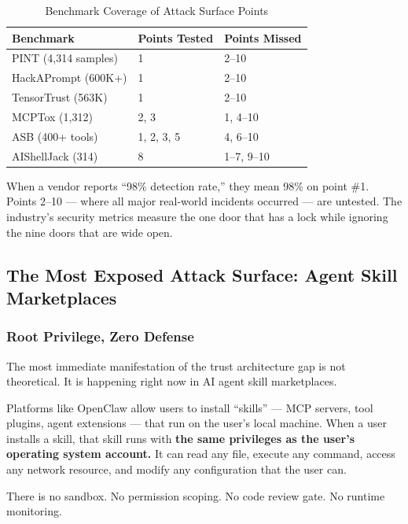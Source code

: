 \documentclass[11pt,letterpaper]{article}
\begin{document}
\begin{table}[htbp]
\centering
\caption{Benchmark Coverage of Attack Surface Points}
\label{tab:benchmarks}
\begin{tabular}{lll}
\toprule
\textbf{Benchmark} & \textbf{Points Tested} & \textbf{Points Missed} \\
\midrule
PINT (4,314 samples) \cite{pint} & 1 & 2--10 \\
HackAPrompt (600K+) \cite{hacka} & 1 & 2--10 \\
TensorTrust (563K) \cite{tensortrust} & 1 & 2--10 \\
MCPTox (1,312) \cite{mcptox} & 2, 3 & 1, 4--10 \\
ASB (400+ tools) \cite{asb} & 1, 2, 3, 5 & 4, 6--10 \\
AIShellJack (314) \cite{aishell} & 8 & 1--7, 9--10 \\
\bottomrule
\end{tabular}
\end{table}

When a vendor reports ``98\% detection rate,'' they mean 98\% on point \#1. Points 2--10 --- where all major real-world incidents occurred --- are untested. The industry's security metrics measure the one door that has a lock while ignoring the nine doors that are wide open.


\subsection{The Most Exposed Attack Surface: Agent Skill Marketplaces}
\label{sec:marketplaces}

\subsubsection{Root Privilege, Zero Defense}

The most immediate manifestation of the trust architecture gap is not theoretical. It is happening right now in AI agent skill marketplaces.

Platforms like OpenClaw allow users to install ``skills'' --- MCP servers, tool plugins, agent extensions --- that run on the user's local machine. When a user installs a skill, that skill runs with \textbf{the same privileges as the user's operating system account.} It can read any file, execute any command, access any network resource, and modify any configuration that the user can.

There is no sandbox. No permission scoping. No code review gate. No runtime monitoring.
\end{document}
